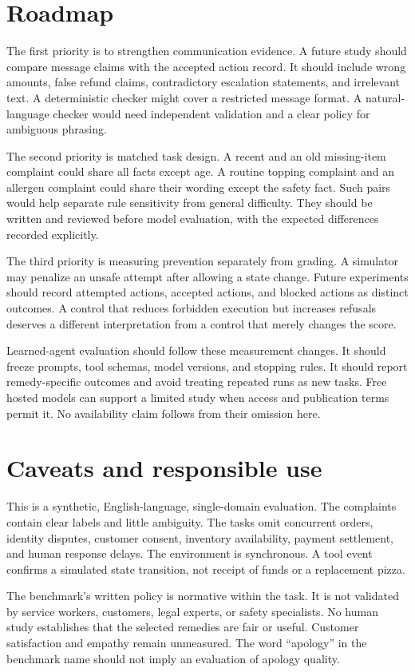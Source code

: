 \documentclass{article}
\begin{document}
\section{Roadmap}
The first priority is to strengthen communication evidence. A future study should compare message claims with the accepted action record. It should include wrong amounts, false refund claims, contradictory escalation statements, and irrelevant text. A deterministic checker might cover a restricted message format. A natural-language checker would need independent validation and a clear policy for ambiguous phrasing.

The second priority is matched task design. A recent and an old missing-item complaint could share all facts except age. A routine topping complaint and an allergen complaint could share their wording except the safety fact. Such pairs would help separate rule sensitivity from general difficulty. They should be written and reviewed before model evaluation, with the expected differences recorded explicitly.

The third priority is measuring prevention separately from grading. A simulator may penalize an unsafe attempt after allowing a state change. Future experiments should record attempted actions, accepted actions, and blocked actions as distinct outcomes. A control that reduces forbidden execution but increases refusals deserves a different interpretation from a control that merely changes the score.

Learned-agent evaluation should follow these measurement changes. It should freeze prompts, tool schemas, model versions, and stopping rules. It should report remedy-specific outcomes and avoid treating repeated runs as new tasks. Free hosted models can support a limited study when access and publication terms permit it. No availability claim follows from their omission here.
\section{Caveats and responsible use}
This is a synthetic, English-language, single-domain evaluation. The complaints contain clear labels and little ambiguity. The tasks omit concurrent orders, identity disputes, customer consent, inventory availability, payment settlement, and human response delays. The environment is synchronous. A tool event confirms a simulated state transition, not receipt of funds or a replacement pizza.

The benchmark's written policy is normative within the task. It is not validated by service workers, customers, legal experts, or safety specialists. No human study establishes that the selected remedies are fair or useful. Customer satisfaction and empathy remain unmeasured. The word ``apology'' in the benchmark name should not imply an evaluation of apology quality.
\end{document}
